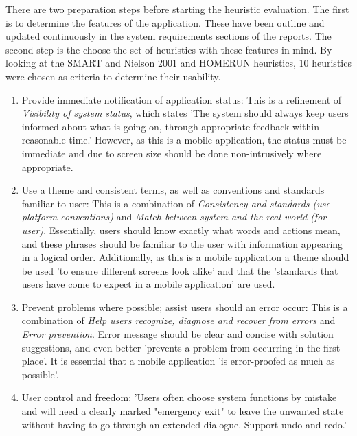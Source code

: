 \documentclass[a4 paper, 12pt]{article}
\begin{document}
    There are two preparation steps before starting the heuristic evaluation. The first is to determine the features of the application. These have been outline and updated continuously in the system requirements sections of the reports. The second step is the choose the set of heuristics with these features in mind. By looking at the \textcolor{mygreen}{SMART} and \textcolor{myblue}{Nielson 2001} and \textcolor{myorange}{HOMERUN} heuristics, 10 heuristics were chosen as criteria to determine their usability.
        \begin{enumerate}
            \item \textcolor{mygreen}{Provide immediate notification of application status}: 
            This is a refinement of \textit{\textcolor{myblue}{Visibility of system status}}, which states 'The system should always keep users informed about what is going on, through appropriate feedback within reasonable time.' However, as this is a mobile application, the status must be immediate and due to screen size should be done non-intrusively where appropriate.
            \item \textcolor{mygreen}{Use a theme and consistent terms, as well as conventions and standards familiar to user}: This is a combination of \textit{\textcolor{myblue}{Consistency and standards (use platform conventions)}} and \textit{\textcolor{myblue}{Match between system and the real world (for user)}}. Essentially, users should know exactly what words and actions mean, and these phrases should be familiar to the user with information appearing in a logical order. Additionally, as this is a mobile application a theme should be used 'to ensure different screens look alike' and that the 'standards that users have come to expect in a mobile application' are used.         
            \item \textcolor{mygreen}{Prevent problems where possible; assist users should an error occur}: This is a combination of \textit{\textcolor{myblue}{Help users recognize, diagnose and recover from errors}} and \textit{\textcolor{myblue}{Error prevention}}. Error message should be clear and concise with solution suggestions, and even better 'prevents a problem from occurring in the first place'. It is essential that a mobile application 'is error-proofed as much as possible'.        
            \item \textcolor{myblue}{User control and freedom:} 'Users often choose system functions by mistake and will need a clearly marked "emergency exit" to leave the unwanted state without having to go through an extended dialogue. Support undo and redo.'        

\end{enumerate}
\end{document}
